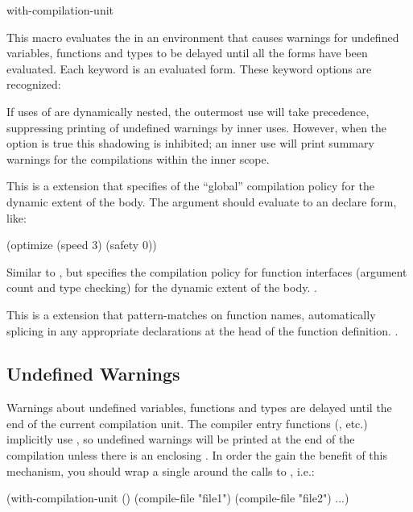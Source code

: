 \begin{defmac}{}{with-compilation-unit}{%
    }
  
  This macro evaluates the  in an environment that causes
  warnings for undefined variables, functions and types to be delayed
  until all the forms have been evaluated.  Each keyword 
  is an evaluated form.  These keyword options are recognized:
  \begin{Lentry}
  
  \item[\kwd{override}] If uses of  are
    dynamically nested, the outermost use will take precedence,
    suppressing printing of undefined warnings by inner uses.
    However, when the  option is true this shadowing is
    inhibited; an inner use will print summary warnings for the
    compilations within the inner scope.
  
  \item[\kwd{optimize}] This is a \cmucl{} extension that specifies of the
    ``global'' compilation policy for the dynamic extent of the body.
    The argument should evaluate to an  declare form,
    like:
    \begin{lisp}
      (optimize (speed 3) (safety 0))
    \end{lisp}
  
  \item[\kwd{optimize-interface}] Similar to , but
    specifies the compilation policy for function interfaces (argument
    count and type checking) for the dynamic extent of the body.
    .
  
  \item[\kwd{context-declarations}] This is a \cmucl{} extension that
    pattern-matches on function names, automatically splicing in any
    appropriate declarations at the head of the function definition.
    .
  \end{Lentry}
\end{defmac}


\subsection{Undefined Warnings}

Warnings about undefined variables, functions and types are delayed until the
end of the current compilation unit.  The compiler entry functions
(, etc.) implicitly use , so undefined
warnings will be printed at the end of the compilation unless there is an
enclosing .  In order the gain the benefit of this
mechanism, you should wrap a single  around the calls
to , i.e.:
\begin{lisp}
(with-compilation-unit ()
  (compile-file "file1")
  (compile-file "file2")
  ...)
\end{lisp}

